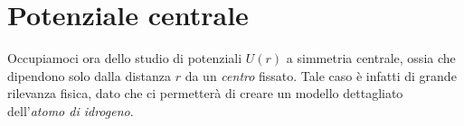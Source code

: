 \documentclass[../../FisicaTeorica.tex]{subfiles}
\begin{document}

\section{Potenziale centrale}
Occupiamoci ora dello studio di potenziali $U(r)$ a simmetria centrale, ossia che dipendono solo dalla distanza $r$ da un \textit{centro} fissato. Tale caso è infatti di grande rilevanza fisica, dato che ci permetterà di creare un modello dettagliato dell'\textit{atomo di idrogeno}.\\
\end{document}
